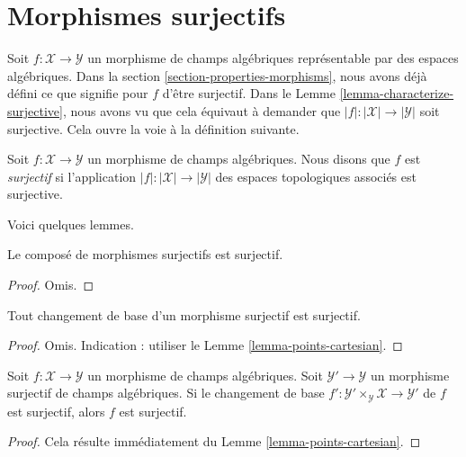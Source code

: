 \section{Morphismes surjectifs}
\label{section-surjective}

\noindent
Soit $f : \mathcal{X} \to \mathcal{Y}$ un morphisme de champs algébriques
représentable par des espaces algébriques. Dans la
section \ref{section-properties-morphisms},
nous avons déjà défini ce que signifie pour $f$ d'être surjectif. Dans le
Lemme \ref{lemma-characterize-surjective},
nous avons vu que cela équivaut à demander que
$|f| : |\mathcal{X}| \to |\mathcal{Y}|$ soit surjective.
Cela ouvre la voie à la définition suivante.

\begin{definition}
\label{definition-surjective}
Soit $f : \mathcal{X} \to \mathcal{Y}$ un morphisme de champs algébriques.
Nous disons que $f$ est {\it surjectif} si l'application
$|f| : |\mathcal{X}| \to |\mathcal{Y}|$ des espaces topologiques associés
est surjective.
\end{definition}

\noindent
Voici quelques lemmes.

\begin{lemma}
\label{lemma-composition-surjective}
Le composé de morphismes surjectifs est surjectif.
\end{lemma}

\begin{proof}
Omis.
\end{proof}

\begin{lemma}
\label{lemma-base-change-surjective}
Tout changement de base d'un morphisme surjectif est surjectif.
\end{lemma}

\begin{proof}
Omis. Indication : utiliser le
Lemme \ref{lemma-points-cartesian}.
\end{proof}

\begin{lemma}
\label{lemma-descent-surjective}
Soit $f : \mathcal{X} \to \mathcal{Y}$ un morphisme de champs algébriques.
Soit $\mathcal{Y}' \to \mathcal{Y}$ un morphisme surjectif de champs
algébriques. Si le changement de base $f' : \mathcal{Y}' \times_\mathcal{Y} \mathcal{X}
\to \mathcal{Y}'$ de $f$ est surjectif, alors $f$ est surjectif.
\end{lemma}

\begin{proof}
Cela résulte immédiatement du
Lemme \ref{lemma-points-cartesian}.
\end{proof}

